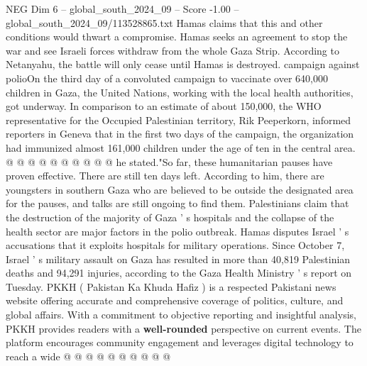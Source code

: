 \begin{textsample}{NEG Dim 6 – global\_south\_2024\_09 – Score -1.00 – global\_south\_2024\_09/113528865.txt}
Hamas claims that this and other conditions would thwart a compromise.
Hamas seeks an agreement to stop the war and see Israeli forces withdraw from the whole Gaza Strip.
According to Netanyahu, the battle will only cease until Hamas is destroyed. campaign against polioOn the third day of a convoluted campaign to vaccinate over 640,000 children in Gaza, the United Nations, working with the local health authorities, got underway.
In comparison to an estimate of about 150,000, the WHO representative for the Occupied Palestinian territory, Rik Peeperkorn, informed reporters in Geneva that in the first two days of the campaign, the organization had immunized almost 161,000 children under the age of ten in the central area. @ @ @ @ @ @ @ @ @ @ he stated."So far, these humanitarian pauses have proven effective.
There are still ten days left.
According to him, there are youngsters in southern Gaza who are believed to be outside the designated area for the pauses, and talks are still ongoing to find them.
Palestinians claim that the destruction of the majority of Gaza ' s hospitals and the collapse of the health sector are major factors in the polio outbreak.
Hamas disputes Israel ' s accusations that it exploits hospitals for military operations.
Since October 7, Israel ' s military assault on Gaza has resulted in more than 40,819 Palestinian deaths and 94,291 injuries, according to the Gaza Health Ministry ' s report on Tuesday.
PKKH ( Pakistan Ka Khuda Hafiz ) is a respected Pakistani news website offering accurate and comprehensive coverage of politics, culture, and global affairs.
With a commitment to objective reporting and insightful analysis, PKKH provides readers with a \textbf{well-rounded} perspective on current events.
The platform encourages community engagement and leverages digital technology to reach a wide @ @ @ @ @ @ @ @ @ @

\end{textsample}
